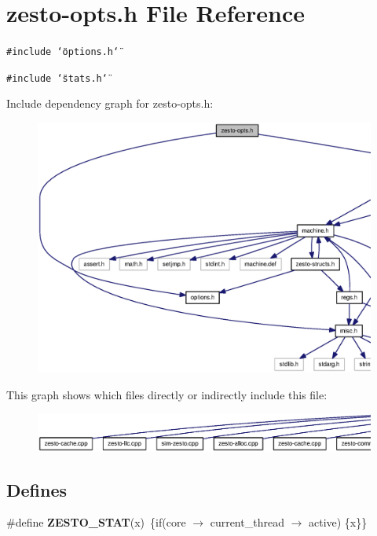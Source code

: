 \section{zesto-opts.h File Reference}
\label{zesto-opts_8h}
{\tt \#include \char`\"{}options.h\char`\"{}}\par
{\tt \#include \char`\"{}stats.h\char`\"{}}\par


Include dependency graph for zesto-opts.h:\nopagebreak
\begin{figure}[H]
\begin{center}
\leavevmode
\includegraphics[width=420pt]{zesto-opts_8h__incl}
\end{center}
\end{figure}


This graph shows which files directly or indirectly include this file:\nopagebreak
\begin{figure}[H]
\begin{center}
\leavevmode
\includegraphics[width=420pt]{zesto-opts_8h__dep__incl}
\end{center}
\end{figure}
\subsection*{Defines}
\begin{CompactItemize}
\item 
\#define {\bf ZESTO\_\-STAT}(x)~\{if(core $\rightarrow$ current\_\-thread $\rightarrow$ active) \{x\}\}
\end{CompactItemize}
